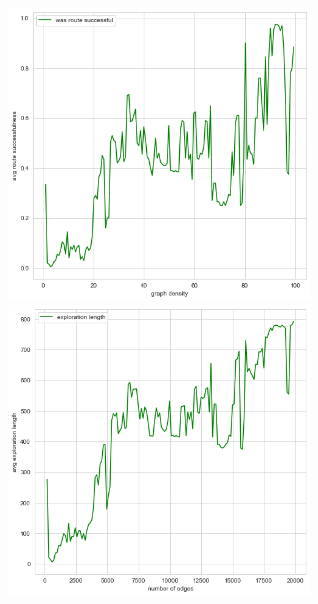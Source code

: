 \documentclass{article}
\begin{document}
\begin{figure}
  \centering
  \includegraphics[width=8cm]{figures/random_uj/edge_den_succ.png}
  \hspace{1cm}
  \includegraphics[width=8cm]{figures/random_uj/edge_expl.png}
  \vspace{1cm}


\end{figure}
\end{document}
